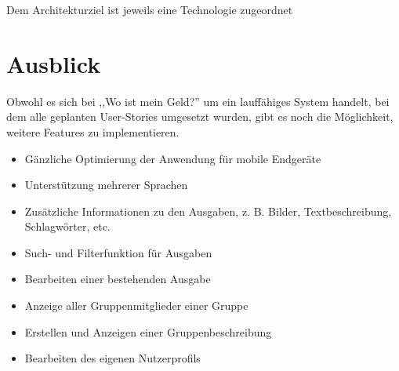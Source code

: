 \documentclass[conference]{IEEEtran}
\begin{document}
\begin{center}
\begin{table}
    \caption{Dem Architekturziel ist jeweils eine Technologie zugeordnet}
    \label{tab:loesungsstrategie}
  \end{table}
\end{center}

\section{Ausblick}
Obwohl es sich bei ,,Wo ist mein Geld?'' um ein lauffähiges System handelt, bei dem alle geplanten User-Stories umgesetzt wurden, gibt es noch die Möglichkeit, weitere Features zu implementieren.
\begin{itemize}
    \item Gänzliche Optimierung der Anwendung für mobile Endgeräte
    \item Unterstützung mehrerer Sprachen
    \item Zusätzliche Informationen zu den Ausgaben, z. B. Bilder, Textbeschreibung, Schlagwörter, etc.
    \item Such- und Filterfunktion für Ausgaben
    \item Bearbeiten einer bestehenden Ausgabe
    \item Anzeige aller Gruppenmitglieder einer Gruppe
    \item Erstellen und Anzeigen einer Gruppenbeschreibung
    \item Bearbeiten des eigenen Nutzerprofils
\end{itemize}

\newpage
\printglossary[style=altlist,title=Glossar]
\vspace{12pt}
\end{document}
